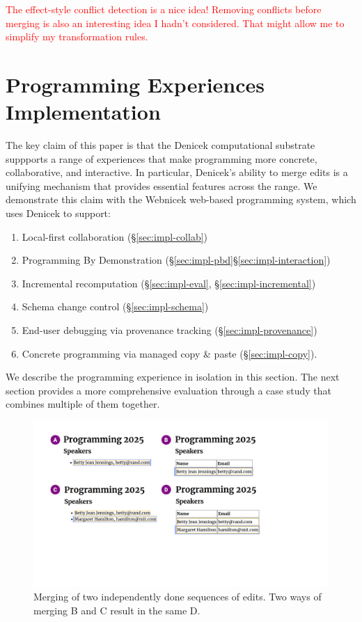 \documentclass[sigconf,anonymous,screen]{acmart}
\newcommand{\note}[1]{\textcolor{red}{#1}}
\begin{document}
\note{The effect-style conflict detection is a nice idea! Removing conflicts before merging is also an interesting idea I hadn't considered. That might allow me to simplify my transformation rules. }


\section{Programming Experiences Implementation}
\label{sec:impl}

The key claim of this paper is that the Denicek computational substrate
suppports a range of experiences that make programming more concrete,
collaborative, and interactive. In particular, Denicek's ability to merge edits is a unifying mechanism that provides essential features across the range. We demonstrate this claim with the Webnicek web-based programming system, which uses Denicek to support:
\begin{enumerate}
\item Local-first collaboration (\S\ref{sec:impl-collab})
\item Programming By Demonstration (\S\ref{sec:impl-pbd}\S\ref{sec:impl-interaction})
\item Incremental recomputation (\S\ref{sec:impl-eval}, \S\ref{sec:impl-incremental})
\item Schema change control (\S\ref{sec:impl-schema})
\item End-user debugging via provenance tracking (\S\ref{sec:impl-provenance})
\item Concrete programming via managed copy \& paste (\S\ref{sec:impl-copy}).
\end{enumerate}

We describe the programming experience in isolation in this section. The next section provides a
more comprehensive evaluation through a case study that combines multiple of them together.


\begin{figure}[t]
\includegraphics[width=0.9\columnwidth,clip,trim=1.7cm 6cm 7.8cm 1.5cm]{fig/merging.pdf}
\caption{Merging of two independently done sequences of edits. Two ways of merging B and C result in the same D.}
\label{fig:merging}
\end{figure}
\end{document}

